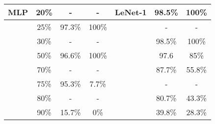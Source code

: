 \begin{table}
\begin{tabular}{|c|c|c|c|c|c|c|}
MLP   & 20\%                         & -                              & -                             & LeNet-1 & 98.5\%                         & \cellcolor[HTML]{BAE5C5}100\%  \\ \hline
      & 25\%                         & 97.3\%                         & \cellcolor[HTML]{BAE5C5}100\% &         & -                              & -                              \\ \hline
      & 30\%                         & -                              & -                             &         & 98.5\%                         & \cellcolor[HTML]{BAE5C5}100\%  \\ \hline
      & 50\%                         & 96.6\%                         & \cellcolor[HTML]{BAE5C5}100\% &         & 97.6                           & \cellcolor[HTML]{BAE5C5}85\%   \\ \hline
      & 70\%                         & -                              & -                             &         & \cellcolor[HTML]{C0C0C0}87.7\% & \cellcolor[HTML]{C0C0C0}55.8\% \\ \hline
      & 75\%                         & 95.3\%                         & \cellcolor[HTML]{FFCCC9}7.7\% &         & -                              & -                              \\ \hline
      & 80\%                         & -                              & -                             &         & \cellcolor[HTML]{C0C0C0}80.7\% & \cellcolor[HTML]{C0C0C0}43.3\% \\ \hline
      & 90\%                         & \cellcolor[HTML]{C0C0C0}15.7\% & \cellcolor[HTML]{C0C0C0}0\%   &         & \cellcolor[HTML]{C0C0C0}39.8\% & \cellcolor[HTML]{C0C0C0}28.3\% \\ \hline
\end{tabular}
\end{table}